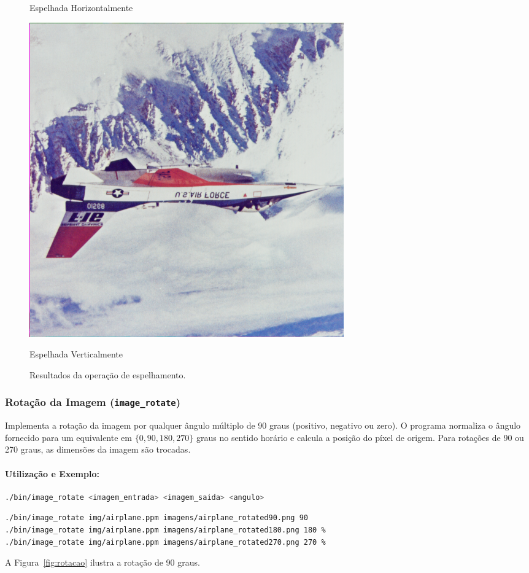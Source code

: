 \documentclass[a4paper, 11pt, portuguese]{article}
\begin{document}
\begin{figure}[htbp]
\begin{minipage}{0.32\textwidth}
    \caption*{Espelhada Horizontalmente}
\end{minipage}
\hfill
\begin{minipage}{0.32\textwidth}
    \centering
    \includegraphics[width=\textwidth]{imagens/airplane_mirror_v.png}
    \caption*{Espelhada Verticalmente}
\end{minipage}
\caption{Resultados da operação de espelhamento.}
\label{fig:espelhamento}
\end{figure}

\subsubsection{Rotação da Imagem (\texttt{image\_rotate})}
Implementa a rotação da imagem por qualquer ângulo múltiplo de 90 graus (positivo, negativo ou zero). O programa normaliza o ângulo fornecido para um equivalente em $\{0, 90, 180, 270\}$ graus no sentido horário e calcula a posição do píxel de origem. Para rotações de 90 ou 270 graus, as dimensões da imagem são trocadas.

\paragraph{Utilização e Exemplo:}
\begin{lstlisting}[language=bash, caption=Sintaxe de Uso do image\_rotate]
./bin/image_rotate <imagem_entrada> <imagem_saida> <angulo>
\end{lstlisting}
\begin{lstlisting}[language=bash]
./bin/image_rotate img/airplane.ppm imagens/airplane_rotated90.png 90
./bin/image_rotate img/airplane.ppm imagens/airplane_rotated180.png 180 %
./bin/image_rotate img/airplane.ppm imagens/airplane_rotated270.png 270 %
\end{lstlisting}
A Figura~\ref{fig:rotacao} ilustra a rotação de 90 graus.
\end{document}
